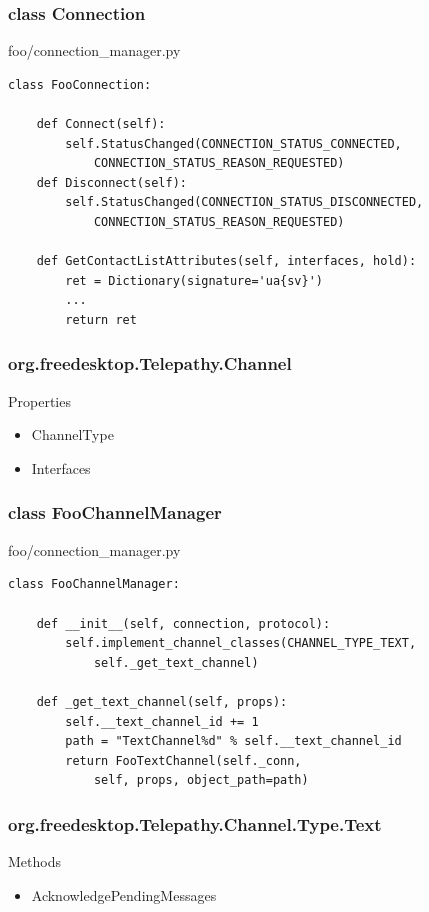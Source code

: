 \documentclass{beamer}
\begin{document}
\begin{frame}[fragile]
    \frametitle{class Connection}
    \begin{block}{foo/connection\_manager.py}
    \begin{verbatim}
class FooConnection:

    def Connect(self):
        self.StatusChanged(CONNECTION_STATUS_CONNECTED,
            CONNECTION_STATUS_REASON_REQUESTED)
    def Disconnect(self):
        self.StatusChanged(CONNECTION_STATUS_DISCONNECTED,
            CONNECTION_STATUS_REASON_REQUESTED)

    def GetContactListAttributes(self, interfaces, hold):
        ret = Dictionary(signature='ua{sv}')
        ...
        return ret
    \end{verbatim}
    \end{block}
\end{frame}

\begin{frame}[fragile]
    \frametitle{org.freedesktop.Telepathy.Channel}
    
    \begin{block}{Properties}
    \begin{itemize}
    \item ChannelType
    \item Interfaces
    \end{itemize}
    \end{block}
\end{frame}

\begin{frame}[fragile]
    \frametitle{class FooChannelManager}
    \begin{block}{foo/connection\_manager.py}
    \begin{verbatim}
class FooChannelManager:

    def __init__(self, connection, protocol):
        self.implement_channel_classes(CHANNEL_TYPE_TEXT,
            self._get_text_channel)

    def _get_text_channel(self, props):
        self.__text_channel_id += 1
        path = "TextChannel%d" % self.__text_channel_id
        return FooTextChannel(self._conn, 
            self, props, object_path=path)
    \end{verbatim}
    \end{block}
\end{frame}

\begin{frame}[fragile]
    \frametitle{org.freedesktop.Telepathy.Channel.Type.Text}

    \begin{block}{Methods}
    \begin{itemize}
    \item AcknowledgePendingMessages
    \end{itemize}
    \end{block}
\end{frame}
\end{document}
